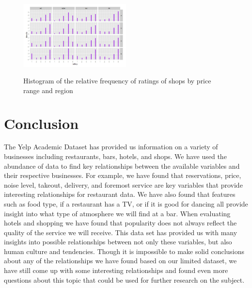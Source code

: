 \documentclass[11pt]{article}
\begin{document}
\begin{figure}[h]
           \caption{Histogram of the relative frequency of ratings of shops by price range and region}
	\centering
	\includegraphics[width=0.5\textwidth]{Figures/shopping3.jpeg}
           \label{shopping3}
\end{figure}


\section{Conclusion}

The Yelp Academic Dataset has provided us information on a variety of businesses including restaurants, bars, hotels, and shops.  We have used the abundance of data to find key relationships between the available variables and their respective businesses.  For example, we have found that reservations, price, noise level, takeout, delivery, and foremost service are key variables that provide interesting relationships for restaurant data.  We have also found that features such as food type, if a restaurant has a TV, or if it is good for dancing all provide insight into what type of atmosphere we will find at a bar.  When evaluating hotels and shopping we have found that popularity does not always reflect the quality of the service we will receive.  This data set has provided us with many insights into possible relationships between not only these variables, but also human culture and tendencies.  Though it is impossible to make solid conclusions about any of the relationships we have found based on our limited dataset, we have still come up with some interesting relationships and found even more questions about this topic that could be used for further research on the subject.
\end{document}
